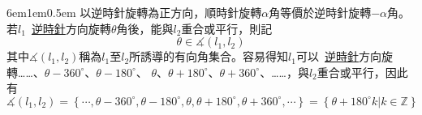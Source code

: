 \documentclass[12pt]{article}
\begin{document}
\begin{mybox}[嚴格定義]{6em}{1em}{0.5em}
    以逆時針旋轉為正方向，順時針旋轉$\alpha$角等價於逆時針旋轉$-\alpha$角。
    若$l_1$\ \underline{逆時針}方向旋轉$\theta$角後，能與$l_2$重合或平行，則記
    $$
        \theta\in\measuredangle{\left(l_1,l_2\right)}
    $$
    其中$\measuredangle{\left(l_1,l_2\right)}$稱為$l_1$至$l_2$所誘導的有向角集合。容易得知$l_1$可以\ \underline{逆時針}方向旋轉……、$\theta-360^{\circ}$、$\theta-180^{\circ}$、
    $\theta$、$\theta+180^{\circ}$、$\theta+360^{\circ}$、……，與$l_2$重合或平行，因此有
    $$
        \measuredangle{\left(l_1,l_2\right)}=\left\{\cdots, \theta-360^{\circ}, \theta-180^{\circ}, \theta, \theta+180^{\circ}, \theta+360^{\circ}, \cdots\right\}=\left\{\theta+180^{\circ}k\left|k\in\mathbb{Z}\right.\right\}
    $$
\end{mybox}
\newpage
\end{document}
